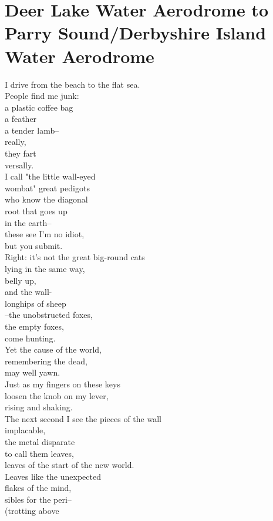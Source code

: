 \documentclass[smalldemyvopaper,11pt,twoside,onecolumn,openright,extrafontsizes]{memoir}
\begin{document}
\chapter{Deer Lake Water Aerodrome to Parry Sound/Derbyshire Island Water Aerodrome}
I drive from the beach to the flat sea.
\\People find me junk:
\\a plastic coffee bag
\\a feather
\\a tender lamb--
\\really,
\\they fart
\\versally.
\\I call "the little wall-eyed
\\wombat" great pedigots
\\who know the diagonal
\\root that goes up
\\in the earth--
\\these see I'm no idiot,
\\but you submit.
\\Right: it's not the great big-round cats
\\lying in the same way,
\\belly up,
\\and the wall-
\\longhips of sheep
\\--the unobstructed foxes,
\\the empty foxes,
\\come hunting.
\\Yet the cause of the world,
\\remembering the dead,
\\may well yawn.
\\Just as my fingers on these keys
\\loosen the knob on my lever,
\\rising and shaking.
\\The next second I see the pieces of the wall
\\implacable,
\\the metal disparate
\\to call them leaves,
\\leaves of the start of the new world.
\\Leaves like the unexpected
\\flakes of the mind,
\\sibles for the peri--
\\(trotting above
\end{document}
